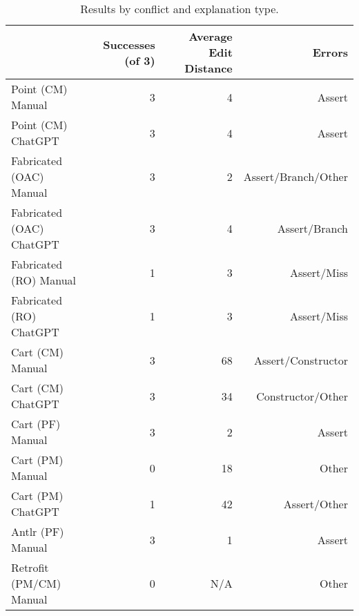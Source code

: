 \begin{table}[t]
    \centering
    \begin{tabular}{@{\extracolsep{\fill}} lrrr} \toprule
                             & Successes (of 3) & Average Edit Distance & Errors \\
    \midrule
    Point (CM) Manual        & 3 & 4 & Assert \\
    Point (CM) ChatGPT       & 3 & 4 & Assert \\
    Fabricated (OAC) Manual  & 3 & 2 & Assert/Branch/Other \\
    Fabricated (OAC) ChatGPT & 3 & 4 & Assert/Branch \\
    Fabricated (RO) Manual   & 1 & 3 & Assert/Miss \\
    Fabricated (RO) ChatGPT  & 1 & 3 & Assert/Miss \\
    Cart (CM) Manual         & 3 & 68 & Assert/Constructor \\
    Cart (CM) ChatGPT        & 3 & 34 & Constructor/Other \\
    Cart (PF) Manual         & 3 & 2 & Assert \\
    Cart (PM) Manual         & 0 & 18 & Other \\
    Cart (PM) ChatGPT        & 1 & 42 & Assert/Other \\
    Antlr (PF) Manual        & 3 & 1 & Assert \\
    Retrofit (PM/CM) Manual  & 0 & N/A & Other \\
    \midrule
    \end{tabular}
    \caption{Results by conflict and explanation type.\label{tab:results:rq2}}
\end{table}

